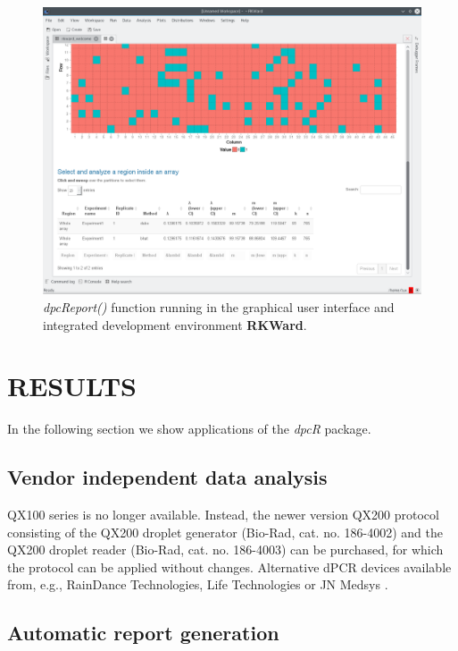 \documentclass[a4,center,fleqn]{NAR}
\begin{document}
\begin{figure}[t]
\begin{center}
\includegraphics[width=17cm]{GUI_RKWard_1.png}
\end{center}
\caption{\textit{dpcReport()} function running in the graphical user interface 
and integrated development environment \textbf{RKWard}.} 
\label{GUI_RKWard_1}
\end{figure}




\section{RESULTS}

In the following section we show applications of the \textit{dpcR} package.

\subsection{Vendor independent data analysis}

QX100 series is no longer available. Instead, the newer version QX200 protocol 
consisting of the QX200 droplet generator (Bio-Rad, cat. no. 186-4002) and the 
QX200 droplet reader (Bio-Rad, cat. no. 186-4003) can be purchased, for which 
the protocol can be applied without changes. Alternative dPCR devices available 
from, e.g., RainDance Technologies, Life Technologies or JN Medsys 
\citep{mock_digital_2016}.

\subsection{Automatic report generation}
\end{document}
